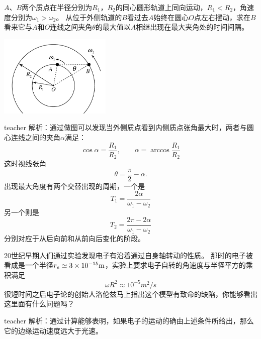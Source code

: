 \begin{example}
$A$、$B$两个质点在半径分别为$R_1$，$R_2$的同心圆形轨道上同向运动，$R_1<R_2$，角速度分别为$ \omega_1> \omega_2$。
从位于外侧轨道的$B$看过去$A$始终在圆心$O$点左右摆动，求在$B$看来它与$A$和$O$连线之间夹角$ \theta$的最大值以$A$相继出现在最大夹角处的时间间隔。
\begin{flushright}
\includegraphics[width=0.4\textwidth]{images/motion-problem-33.pdf}
\end{flushright}

\begin{taggedblock}{teacher}
\noindent
解析：通过做图可以发现当外侧质点看到内侧质点张角最大时，两者与圆心连线之间的夹角$\alpha$满足：
\[
\cos\alpha = \frac{R_1}{R_2},\qquad \alpha = \arccos\frac{R_1}{R_2}
\]
这时视线张角
\[
\theta = \frac{\pi}{2}-\alpha.
\]
出现最大角度有两个交替出现的周期，一个是
\[
T_1 = \frac{2\alpha}{\omega_1-\omega_2}
\]
另一个则是
\[
T_2 = \frac{2\pi-2\alpha}{\omega_1-\omega_2}
\]
分别对应于从后向前和从前向后变化的阶段。

\end{taggedblock}
\end{example}











\begin{example}
20世纪早期人们通过实验发现电子有沿着通过自身轴转动的性质。
那时的电子被看成是一个半径$r_e \simeq 3\times 10^{-15}{\rm{m}}$，实验上要求电子自转的角速度与半径平方的乘积满足
\[  \omega R^2 \approx 10^{-5}\unit{m^2/s}\]
很短时间之后电子论的创始人洛伦兹马上指出这个模型有致命的缺陷，你能够看出这里面有什么问题吗？
\begin{taggedblock}{teacher}
\newline
解析：通过计算能够表明，如果电子的运动的确由上述条件所给出，那么它的边缘运动速度远大于光速。
\end{taggedblock}
\end{example}

